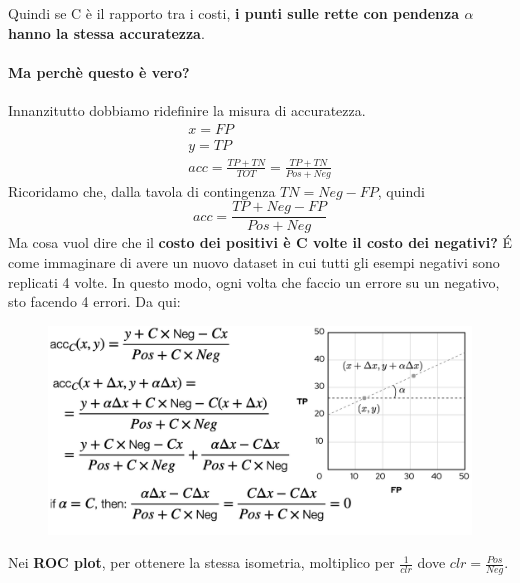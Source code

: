 Quindi se C è il rapporto tra i costi, \textbf{i punti sulle rette con pendenza $\alpha$ hanno la stessa accuratezza}.

\paragraph{Ma perchè questo è vero?} Innanzitutto dobbiamo ridefinire la misura di accuratezza.
\begin{equation}
\begin{split}
    x=FP    \\
    y=TP    \\
    acc=\frac{TP+TN}{TOT}=\frac{TP+TN}{Pos+Neg}
\end{split}
\end{equation}
Ricoridamo che, dalla tavola di contingenza $TN=Neg-FP$, quindi
\begin{equation}
    acc=\frac{TP+Neg-FP}{Pos+Neg}
\end{equation}
Ma cosa vuol dire che il \textbf{costo dei positivi è C volte il costo dei negativi?} \'{E} come immaginare di avere un nuovo dataset in cui tutti gli esempi negativi sono replicati 4 volte. In questo modo, ogni volta che faccio un errore su un negativo, sto facendo 4 errori. Da qui:
\begin{figure}[!h]
    \centering
    \includegraphics[scale=0.5]{images/newAcc.png}
    \label{fig:enter-label}
\end{figure}

Nei \textbf{ROC plot}, per ottenere la stessa isometria, moltiplico per $\frac{1}{clr}$ dove $clr=\frac{Pos}{Neg}$.
